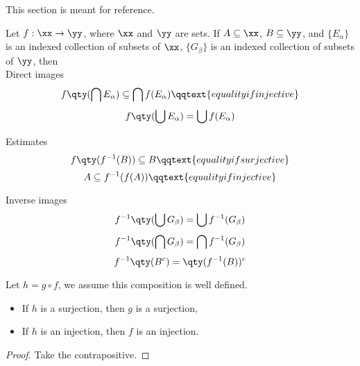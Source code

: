 \documentclass[../main-v2-manifolds.tex]{subfiles}
\begin{document}
\providecommand{\szz}{\mathcal{S}}
\providecommand{\ccinf}{C_c^\infty}

\providecommand{\Taux}{\Tau_\xx}
\providecommand{\Tauy}{\Tau_\yy}
\providecommand{\Tauxy}{\Tau_{\xx\times\yy}}

\providecommand{\Bx}{\borel_\xx}
\providecommand{\By}{\borel_\yy}
\providecommand{\Bxy}{\borel_{\xx\times\yy}}


\newpage
{}
This section is meant for reference.
\begin{wts}
    Let $f:\xx\to\yy$, where $\xx$ and $\yy$ are sets. If $A\subseteq\xx$, $B\subseteq\yy$, and $\{E_\alpha\}$ is an indexed collection of subsets of $\xx$, $\{G_\beta\}$ is an indexed collection of subsets of $\yy$, then\\

    Direct images
    \begin{equation}
        f\qty(\bigcap E_\alpha)\subseteq\bigcap f(E_\alpha)\qqtext{equality if injective}
    \end{equation}
    \begin{equation}
        f\qty(\bigcup E_\alpha)=\bigcup f(E_\alpha)
    \end{equation}
    
    Estimates
    \begin{equation}
        f\qty(f^{-1}(B))\subseteq B\qqtext{equality if surjective}
    \end{equation}
    \begin{equation}
        A\subseteq f^{-1}(f(A))\qqtext{equality if injective}
    \end{equation}
    
    Inverse images
    \begin{equation}
        f^{-1}\qty(\bigcup G_\beta)=\bigcup f^{-1}(G_\beta)
    \end{equation}
    \begin{equation}
        f^{-1}\qty(\bigcap G_\beta)=\bigcap f^{-1}(G_\beta)
    \end{equation}
    \begin{equation}
        f^{-1}\qty(B^c)= \qty(f^{-1}(B))^c
    \end{equation}
\end{wts}

\begin{wts}
    Let $h = g\circ f$, we assume this composition is well defined. 
    \begin{itemize}
        \item If $h$ is a surjection, then $g$ is a surjection,
        \item If $h$ is an injection, then $f$ is an injection.
    \end{itemize}
\end{wts}
\begin{proof}
    Take the contrapositive.
\end{proof}
\end{document}
